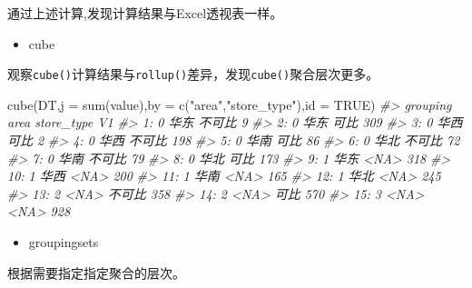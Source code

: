 \documentclass[
]{book}
\newenvironment{Shaded}{\begin{snugshade}}{\end{snugshade}}
\newcommand{\AttributeTok}[1]{\textcolor[rgb]{0.77,0.63,0.00}{#1}}
\newcommand{\CommentTok}[1]{\textcolor[rgb]{0.56,0.35,0.01}{\textit{#1}}}
\newcommand{\ConstantTok}[1]{\textcolor[rgb]{0.00,0.00,0.00}{#1}}
\newcommand{\FunctionTok}[1]{\textcolor[rgb]{0.00,0.00,0.00}{#1}}
\newcommand{\NormalTok}[1]{#1}
\newcommand{\StringTok}[1]{\textcolor[rgb]{0.31,0.60,0.02}{#1}}
\providecommand{\tightlist}{%
  \setlength{\itemsep}{0pt}\setlength{\parskip}{0pt}}
\begin{document}
通过上述计算,发现计算结果与Excel透视表一样。

\begin{itemize}
\tightlist
\item
  cube
\end{itemize}

观察\texttt{cube()}计算结果与\texttt{rollup()}差异，发现\texttt{cube()}聚合层次更多。

\begin{Shaded}
\begin{Highlighting}[]
\FunctionTok{cube}\NormalTok{(DT,}\AttributeTok{j =} \FunctionTok{sum}\NormalTok{(value),}\AttributeTok{by =} \FunctionTok{c}\NormalTok{(}\StringTok{"area"}\NormalTok{,}\StringTok{"store\_type"}\NormalTok{),}\AttributeTok{id =} \ConstantTok{TRUE}\NormalTok{)}
\CommentTok{\#\textgreater{}     grouping area store\_type  V1}
\CommentTok{\#\textgreater{}  1:        0 华东     不可比   9}
\CommentTok{\#\textgreater{}  2:        0 华东       可比 309}
\CommentTok{\#\textgreater{}  3:        0 华西       可比   2}
\CommentTok{\#\textgreater{}  4:        0 华西     不可比 198}
\CommentTok{\#\textgreater{}  5:        0 华南       可比  86}
\CommentTok{\#\textgreater{}  6:        0 华北     不可比  72}
\CommentTok{\#\textgreater{}  7:        0 华南     不可比  79}
\CommentTok{\#\textgreater{}  8:        0 华北       可比 173}
\CommentTok{\#\textgreater{}  9:        1 华东       \textless{}NA\textgreater{} 318}
\CommentTok{\#\textgreater{} 10:        1 华西       \textless{}NA\textgreater{} 200}
\CommentTok{\#\textgreater{} 11:        1 华南       \textless{}NA\textgreater{} 165}
\CommentTok{\#\textgreater{} 12:        1 华北       \textless{}NA\textgreater{} 245}
\CommentTok{\#\textgreater{} 13:        2 \textless{}NA\textgreater{}     不可比 358}
\CommentTok{\#\textgreater{} 14:        2 \textless{}NA\textgreater{}       可比 570}
\CommentTok{\#\textgreater{} 15:        3 \textless{}NA\textgreater{}       \textless{}NA\textgreater{} 928}
\end{Highlighting}
\end{Shaded}

\begin{itemize}
\tightlist
\item
  groupingsets
\end{itemize}

根据需要指定指定聚合的层次。
\end{document}
